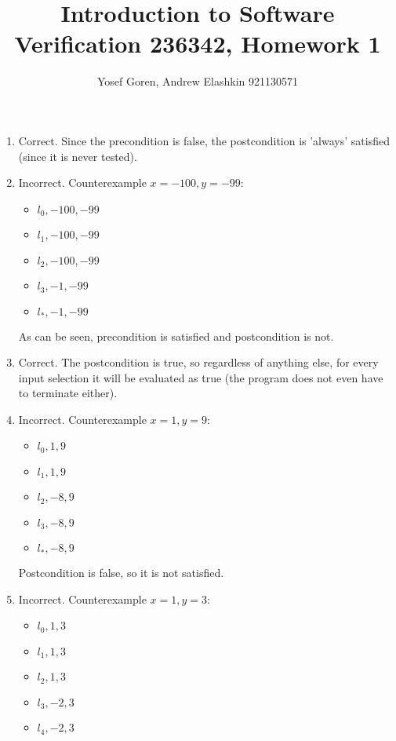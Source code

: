 \documentclass{article}
\begin{document}
\author{Yosef Goren, Andrew Elashkin 921130571}
\title{Introduction to Software Verification 236342, Homework 1}
\maketitle
\section{}
\begin{enumerate}[label=\Alph*.]
    \item Correct. Since the precondition is false, the postcondition is 'always' satisfied (since it is never tested).
    \item Incorrect. Counterexample $x=-100,y=-99$:
    \begin{itemize}
        \item $l_0, -100, -99$
        \item $l_1, -100, -99$
        \item $l_2, -100, -99$
        \item $l_3, -1, -99$
        \item $l_*, -1, -99$
    \end{itemize}
    As can be seen, precondition is satisfied and postcondition is not.
    \item Correct. The postcondition is true, so regardless of anything else,
    for every input selection it will be evaluated as true (the program does not even have to terminate either).
    \item Incorrect. Counterexample $x=1, y=9$:
    \begin{itemize}
        \item $l_0, 1, 9$
        \item $l_1, 1, 9$
        \item $l_2, -8, 9$
        \item $l_3, -8, 9$
        \item $l_*, -8, 9$
    \end{itemize}
    Postcondition is false, so it is not satisfied.
    \item Incorrect. Counterexample $x=1, y=3$:
    \begin{itemize}
        \item $l_0, 1, 3$
        \item $l_1, 1, 3$
        \item $l_2, 1, 3$
        \item $l_3, -2, 3$
        \item $l_4, -2, 3$

\end{itemize}
\end{enumerate}
\end{document}
